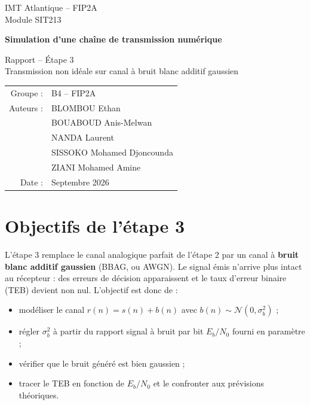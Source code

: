 \documentclass[11pt,a4paper]{article}
\newcommand{\EbNo}{E_b/N_0}
\begin{document}
\begin{titlepage}\centering
{\large IMT Atlantique -- FIP2A\\ Module SIT213\par}\vspace{3cm}
{\LARGE\bfseries Simulation d'une chaîne de transmission numérique\par}\vspace{0.6cm}
{\Large Rapport -- Étape 3\\[4pt]\normalsize Transmission non idéale sur canal à bruit blanc additif gaussien\par}\vspace{2.5cm}
\begin{tabular}{rl}
Groupe : & B4 -- FIP2A\\[4pt]
Auteurs : & BLOMBOU Ethan\\ & BOUABOUD Anis-Melwan\\ & NANDA Laurent\\ & SISSOKO Mohamed Djoncounda\\ & ZIANI Mohamed Amine\\[4pt]
Date : & Septembre 2026
\end{tabular}\vfill
\end{titlepage}
\tableofcontents\newpage

\section{Objectifs de l'étape 3}
L'étape 3 remplace le canal analogique parfait de l'étape 2 par un canal à \textbf{bruit blanc additif gaussien} (BBAG, ou AWGN). Le signal émis n'arrive plus intact au récepteur : des erreurs de décision apparaissent et le taux d'erreur binaire (TEB) devient non nul. L'objectif est donc de :
\begin{itemize}
  \item modéliser le canal $r(n) = s(n) + b(n)$ avec $b(n)\sim\mathcal N(0,\sigma_b^2)$ ;
  \item régler $\sigma_b^2$ à partir du rapport signal à bruit par bit $\EbNo$ fourni en paramètre ;
  \item vérifier que le bruit généré est bien gaussien ;
  \item tracer le TEB en fonction de $\EbNo$ et le confronter aux prévisions théoriques.
\end{itemize}
\end{document}

